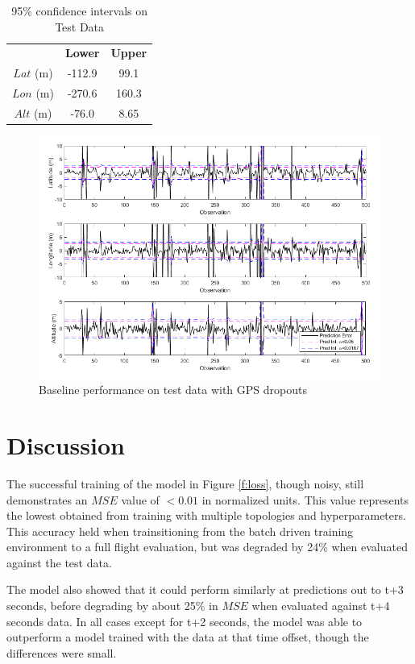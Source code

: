 \documentclass[10pt]{IEEEtran}
\begin{document}
\begin{table}
    \caption{95\% confidence intervals on Test Data}
    \centering
    \begin{tabular}{ccc}
        \hline
        &\textbf{Lower}&\textbf{Upper}\\
        $Lat$ (m)& -112.9 & 99.1\\
        $Lon$ (m)& -270.6 & 160.3\\
        $Alt$ (m)& -76.0 & 8.65\\
        \hline
    \end{tabular}
    \label{t:conf_int}
\end{table}

\begin{figure}
    \includegraphics[width=0.95\columnwidth]{untrim_predict.png}
    \caption{Baseline performance on test data with GPS dropouts}
    \label{f:baseline}
\end{figure}

\section{Discussion}
 The successful training of the model in Figure \ref{f:loss}, though noisy, still demonstrates an $MSE$ value of $<0.01$ in normalized units. This value represents the lowest obtained from training with multiple topologies and hyperparameters. This accuracy held when trainsitioning from the batch driven training environment to a full flight evaluation, but was degraded by 24\% when evaluated against the test data.

The model also showed that it could perform similarly at predictions out to t+3 seconds, before degrading by about 25\% in $MSE$ when evaluated against t+4 seconds data. In all cases except for t+2 seconds, the model was able to outperform a model trained with the data at that time offset, though the differences were small.
\end{document}
